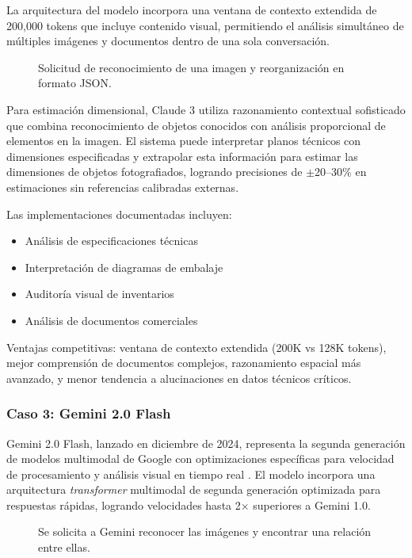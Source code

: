La arquitectura del modelo incorpora una ventana de contexto extendida de 200,000 tokens que incluye contenido visual, permitiendo el análisis simultáneo de múltiples imágenes y documentos dentro de una sola conversación.

\begin{figure}[H]
    \centering
    \caption{Solicitud de reconocimiento de una imagen y reorganización en formato JSON.}
    \label{fig:claude3_json}
\end{figure}

Para estimación dimensional, Claude 3 utiliza razonamiento contextual sofisticado que combina reconocimiento de objetos conocidos con análisis proporcional de elementos en la imagen. El sistema puede interpretar planos técnicos con dimensiones especificadas y extrapolar esta información para estimar las dimensiones de objetos fotografiados, logrando precisiones de $\pm$20--30\% en estimaciones sin referencias calibradas externas.

Las implementaciones documentadas incluyen:
\begin{itemize}
    \item Análisis de especificaciones técnicas
    \item Interpretación de diagramas de embalaje
    \item Auditoría visual de inventarios
    \item Análisis de documentos comerciales
\end{itemize}

Ventajas competitivas: ventana de contexto extendida (200K vs 128K tokens), mejor comprensión de documentos complejos, razonamiento espacial más avanzado, y menor tendencia a alucinaciones en datos técnicos críticos.

\subsubsection{Caso 3: Gemini 2.0 Flash}

Gemini 2.0 Flash, lanzado en diciembre de 2024, representa la segunda generación de modelos multimodal de Google con optimizaciones específicas para velocidad de procesamiento y análisis visual en tiempo real \cite{Team2025}. El modelo incorpora una arquitectura \textit{transformer} multimodal de segunda generación optimizada para respuestas rápidas, logrando velocidades hasta 2$\times$ superiores a Gemini 1.0.

\begin{figure}[H]
    \centering
    \caption{Se solicita a Gemini reconocer las imágenes y encontrar una relación entre ellas.}
    \label{fig:gemini_analysis}
\end{figure}


